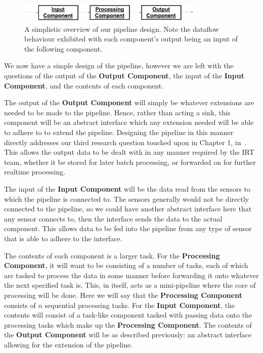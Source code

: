 \begin{figure}[ht]
  \centering
  \includegraphics[width=0.8\textwidth]{includes/figures/fig_pipeline_simple}
  \caption{A simplistic overview of our pipeline design. Note the dataflow behaviour exhibited with each component's output
  being an input of the following component.}
  \label{fig:pipeline_simple}
\end{figure}

We now have a simple design of the pipeline, however we are left with the questions of the output of the \textbf{Output Component},
the input of the \textbf{Input Component}, and the contents of each component.

The output of the \textbf{Output Component}
will simply be whatever extensions are needed to be made to the pipeline. Hence, rather than acting a sink, this component
will be an abstract interface which any extension needed will be able to adhere to to extend the pipeline. Designing the pipeline
in this manner directly addresses our third research question touched upon in Chapter 1, in~.
This allows the output data to be dealt with in any manner required by the IRT team, whether it be stored for later
batch processing, or forwarded on for further realtime processing.

The input of the \textbf{Input Component} will be the data read from the sensors to which the pipeline is connected to.
The sensors generally would not be directly connected to the pipeline, so we could have another abstract interface here
that any sensor connects to, then the interface sends the data to the actual component. This allows data to be fed into
the pipeline from any type of sensor that is able to adhere to the interface.

The contents of each component is a larger task. For the \textbf{Processing Component}, it will want to be consisting
of a number of tasks, each of which are tasked to process the data in some manner before forwarding it onto whatever
the next specified task is. This, in itself, acts as a mini-pipeline where the core of processing will be done. Here
we will say that the \textbf{Processing Component} consists of $n$ sequential processing tasks. For the \textbf{Input Component},
the contents will consist of a task-like component tasked with passing data onto the processing tasks which make up the
\textbf{Processing Component}. The contents of the
\textbf{Output Component} will be as described previously: an abstract interface allowing for the extension of the pipeline.

